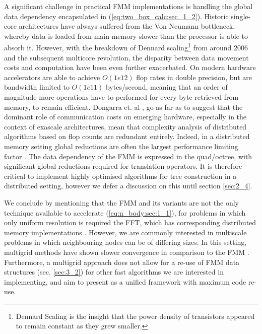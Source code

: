 A significant challenge in practical FMM implementations is handling the global data dependency encapsulated in (\ref{eq:two_box_calc:sec_1_2}). Historic single-core architectures have always suffered from the Von Neumann bottleneck, whereby data is loaded from main memory slower than the processor is able to absorb it. However, with the breakdown of Dennard scaling\footnote{Dennard Scaling is the insight that the power density of transistors appeared to remain constant as they grew smaller.} from around 2006 and the subsequent multicore revolution, the disparity between data movement costs and computation have been even further exacerbated. On modern hardware accelerators are able to achieve $O(1e12)$ flop rates in double precision, but are bandwidth limited to $O(1e11)$ bytes/second, meaning that an order of magnitude more operations have to performed for every byte retrieved from memory, to remain efficient. Dongarra et. al \cite{dongarra2017extreme}, go as far as to suggest that the dominant role of communication costs on emerging hardware, especially in the context of exascale architectures, mean that complexity analysis of distributed algorithms based on flop counts are redundant entirely. Indeed, in a distributed memory setting global reductions are often the largest performance limiting factor \cite{dongarra2017extreme}. The data dependency of the FMM is expressed in the quad/octree, with significant global reductions required for translation operators. It is therefore critical to implement highly optimised algorithms for tree construction in a distributed setting, however we defer a discussion on this until section \ref{sec:2_4}.

We conclude by mentioning that the \gls{FMM} and its variants are not the only technique available to accelerate (\ref{eq:n_body:sec:1_1}), for problems in which only uniform resolution is required the \gls{FFT}, which has corresponding distributed memory implementations \cite{gholami2015accfft}. However, we are commonly interested in multiscale problems in which neighbouring nodes can be of differing sizes. In this setting, multigrid methods have shown slower convergence in comparison to the FMM \cite{yokota2015fast,gholami2016fft}. Furthermore, a multigrid approach does not allow for a re-use of FMM data structures (sec. \ref{sec:3_2}) for other fast algorithms we are interested in implementing, and aim to present as a unified framework with maximum code re-use. 

